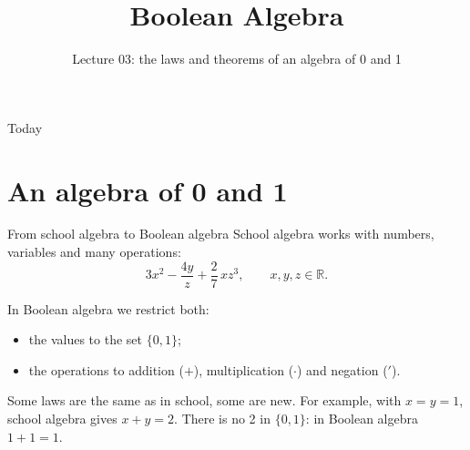 \documentclass[10pt]{wosm-slides}
\title[Lecture 03 \textperiodcentered\ Boolean Algebra]{Boolean Algebra}
\subtitle{Lecture 03: the laws and theorems of an algebra of 0 and 1}
\begin{document}
\maketitle

\begin{frame}{Today}
  \tableofcontents
\end{frame}

\section{An algebra of 0 and 1}

\begin{frame}{From school algebra to Boolean algebra}
  School algebra works with numbers, variables and many operations:
  \[ 3x^2 - \frac{4y}{z} + \frac{2}{7}\,x z^3, \qquad x, y, z \in \mathbb{R}. \]

  In \alert{Boolean algebra} we restrict both:
  \begin{itemize}
    \item the values to the set $\{0, 1\}$;
    \item the operations to addition ($+$), multiplication ($\cdot$) and
      negation ($'$).
  \end{itemize}

  \medskip
  Some laws are the same as in school, some are new. For example, with $x = y = 1$,
  school algebra gives $x + y = 2$. There is no 2 in $\{0, 1\}$: in Boolean algebra
  $1 + 1 = 1$.

  \medskip
\end{frame}
\end{document}
